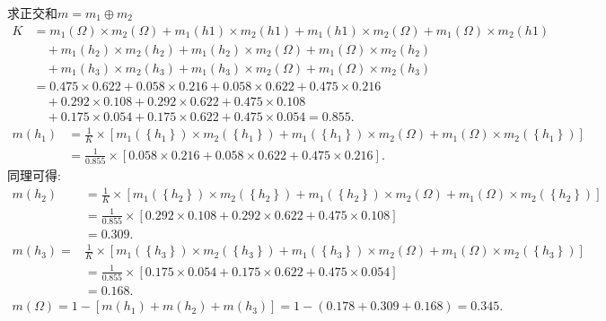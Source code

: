 求正交和$m=m_1\oplus m_2$
\begin{align*}
   K&=m_1(\Omega )\times m_2(\Omega )+m_1({h1})\times m_2({h1})+m_1({h1})\times m_2(\Omega )+m_1(\Omega )\times m_2({h1})\\
    &\quad +m_1({h_2})\times m_2({h_2})+m_1({h_2})\times m_2(\Omega )+m_1(\Omega )\times m_2({h_2})\\
    &\quad +m_1({h_3})\times m_2({h_3})+m_1({h_3})\times m_2(\Omega )+m_1(\Omega )\times m_2({h_3})\\
   &=0.475\times 0.622+0.058\times 0.216+0.058\times 0.622+0.475\times 0.216\\
   &\quad +0.292\times 0.108+0.292\times 0.622+0.475\times 0.108\\
   &\quad  +0.175\times 0.054+0.175\times 0.622+0.475\times 0.054 =0.855.
 \end{align*}
\begin{align*}
m\left(h_{1}\right) &=\frac{1}{K} \times\left[m_{1}\left(\left\{h_{1}\right\}\right) \times m_{2}\left(\left\{h_{1}\right\}\right)+m_{1}
       \left(\left\{h_{1}\right\}\right) \times m_{2}(\Omega)+m_{1}(\Omega) \times m_{2}\left(\left\{h_{1}\right\}\right)\right] \\
&=\frac{1}{0.855} \times[0.058 \times 0.216+0.058 \times 0.622+0.475 \times 0.216].
\end{align*}
同理可得:
\begin{align*}
m\left(h_{2}\right) &=\frac{1}{K} \times\left[m_{1}\left(\left\{h_{2}\right\}\right) \times m_{2}\left(\left\{h_{2}\right\}\right)+m_{1}\left(\left\{h_{2}\right\}\right) \times m_{2}(\Omega)+m_{1}(\Omega) \times m_{2}\left(\left\{h_{2}\right\}\right)\right] \\ &=\frac{1}{0.855} \times[0.292 \times 0.108+0.292 \times 0.622+0.475 \times 0.108] \\
&=0.309. \\
m\left(h_{3}\right)=& \frac{1}{K} \times\left[m_{1}\left(\left\{h_{3}\right\}\right) \times m_{2}\left(\left\{h_{3}\right\}\right)+m_{1}\left(\left\{h_{3}\right\}\right) \times m_{2}(\Omega)+m_{1}(\Omega) \times m_{2}\left(\left\{h_{3}\right\}\right)\right] \\ &=\frac{1}{0.855} \times[0.175 \times 0.054+0.175 \times 0.622+0.475 \times 0.054] \\
&=0.168.
\end{align*}
\begin{align*}
  m(\Omega )=1-[m({h_1})+m({h_2})+m{(h_3)}]=1-(0.178+0.309+0.168)=0.345.
\end{align*}

